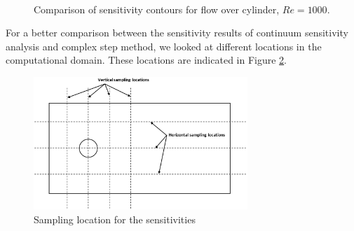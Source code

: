 \documentclass{aiaa-pretty}
\begin{document}
\begin{figure}[H]
{	}
	\\
	\quad
	\caption{Comparison of sensitivity contours for flow over cylinder, $Re = 1000$.}
	\label{fig:cylinderSensitivityContourRE1000}
\end{figure}
%

For a better comparison between the sensitivity results of continuum sensitivity analysis and complex step method, we looked at different locations in the computational domain. These locations are indicated in Figure \ref{fig:cylinderSampleLocations}.

%
\begin{figure}[H]
	\centering
	\includegraphics[height=5.0cm]{figure/cylinder/sampling_location.png}
	\caption{Sampling location for the sensitivities}
	\label{fig:cylinderSampleLocations}
\end{figure}
%
\end{document}
